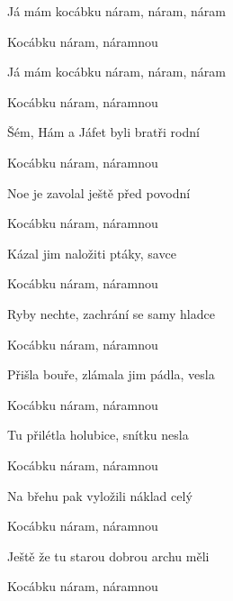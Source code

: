 \begin{song}
\begin{chorusbox}{\Refren}
\bigskip

Já mám kocábku náram, náram, náram \par
{}Kocábku náram, náramnou \par
Já mám kocábku náram, náram, náram \par
{}Kocábku náram, náramnou \par
\end{chorusbox}

\bigskip

Šém, Hám a Jáfet byli bratři rodní \par
{}Kocábku náram, náramnou \par
{}Noe je zavolal ještě před povodní \par
{}Kocábku náram, náramnou \par
{}Kázal jim naložiti ptáky, savce \par
{}Kocábku náram, náramnou \par
{}Ryby nechte, zachrání se samy hladce \par
{}Kocábku náram, náramnou \par

\bigskip

\Refren

\bigskip

Přišla bouře, zlámala jim pádla, vesla \par
{}Kocábku náram, náramnou \par
{}Tu přilétla holubice, snítku nesla \par
{}Kocábku náram, náramnou \par
{}Na břehu pak vyložili náklad celý \par
{}Kocábku náram, náramnou \par
{}Ještě že tu starou dobrou archu měli \par
{}Kocábku náram, náramnou \par

\bigskip

\Refren

\end{song}
